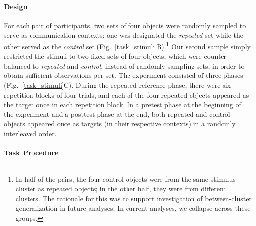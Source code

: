 \documentclass[11pt,letterpaper]{article}
\begin{document}
\paragraph{Design}
For each pair of participants, two sets of four objects were randomly sampled to serve as communication contexts: one was designated the \emph{repeated} set while the other served as the \emph{control} set (Fig.~\ref{task_stimuli}B).\footnote{In half of the pairs, the four control objects were from the same stimulus cluster as repeated objects; in the other half, they were from different clusters. The rationale for this was to support investigation of between-cluster generalization in future analyses. In current analyses, we collapse across these groups.} 
Our second sample simply restricted the stimuli to two fixed sets of four objects, which were counter-balanced to \emph{repeated} and \emph{control}, instead of randomly sampling sets, in order to obtain sufficient observations per set.
The experiment consisted of three phases (Fig.~\ref{task_stimuli}C).
During the repeated reference phase, there were six repetition blocks of four trials, and each of the four repeated objects appeared as the target once in each repetition block.
In a pretest phase at the beginning of the experiment and a posttest phase at the end, both repeated and control objects appeared once as targets (in their respective contexts) in a randomly interleaved order.

\paragraph{Task Procedure}
\end{document}
